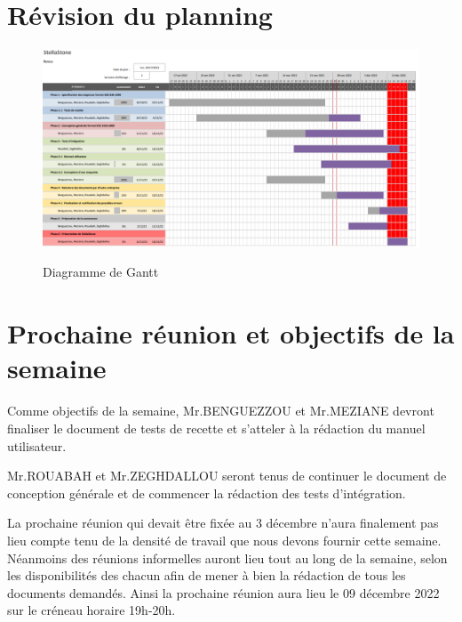 \documentclass[a4paper, 12pt]{article}
\begin{document}
\newpage
\section{Révision du planning}

 \begin{figure}[!h]
    \centering
    \includegraphics[scale=0.45]{diagramme.png}
    \label{fig:Le_planning}
    \caption{Diagramme de Gantt}
\end{figure}
\section{Prochaine réunion et objectifs de la semaine}
Comme objectifs de la semaine, Mr.BENGUEZZOU et Mr.MEZIANE devront finaliser le document de tests de recette et s'atteler à la rédaction du manuel utilisateur. 

Mr.ROUABAH et Mr.ZEGHDALLOU seront tenus de continuer le document de conception générale et de commencer la rédaction des tests d'intégration.

La prochaine réunion qui devait être fixée au 3 décembre n'aura finalement pas lieu compte tenu de la densité de travail que nous devons fournir cette semaine. Néanmoins des réunions informelles auront lieu tout au long de la semaine, selon les disponibilités des chacun afin de mener à bien la rédaction de tous les documents demandés. Ainsi la prochaine réunion aura lieu le 09 décembre 2022 sur le créneau horaire 19h-20h.
\end{document}
